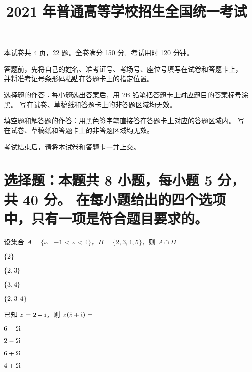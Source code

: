 \documentclass[zihao = -4]{exam-zh}
\begin{document}
\ExplSyntaxOn

\ExplSyntaxOff

\title{2021 年普通高等学校招生全国统一考试}

\subject{数学}

\maketitle

本试卷共 4 页，22 题。全卷满分 150 分。考试用时 120 分钟。

\goodluck

\begin{notice}
  \item 答题前，先将自己的姓名、准考证号、考场号、座位号填写在试卷和答题卡上，
    并将准考证号条形码粘贴在答题卡上的指定位置。
  \item 选择题的作答：每小题选出答案后，用 2B 铅笔把答题卡上对应题目的答案标号涂黑。
    写在试卷、草稿纸和答题卡上的非答题区域均无效。
  \item 填空题和解答题的作答：用黑色签字笔直接答在答题卡上对应的答题区域内。
    写在试卷、草稿纸和答题卡上的非答题区域均无效。
  \item 考试结束后，请将本试卷和答题卡一并上交。
\end{notice}



\section{%
  选择题：本题共 8 小题，每小题 5 分，共 40 分。
  在每小题给出的四个选项中，只有一项是符合题目要求的。
}

\begin{question}
  设集合 $A = \{x \mid -1 < x < 4\}$，$B = \{2, 3, 4, 5\}$，则 $A \cap B = $ \paren

  \begin{choices}
    \item $\{2\}$
    \item $\{2, 3\}$
    \item $\{3, 4\}$
    \item $\{2, 3, 4\}$
  \end{choices}
\end{question}

\begin{question}
  已知 $z = 2 - \mathrm{ i }$，则 $z (\bar{z} + \mathrm{ i }) = $ \paren
  \begin{choices}
    \item $6 - 2\mathrm{ i }$
    \item $2 - 2\mathrm{ i }$
    \item $6 + 2\mathrm{ i }$
    \item $4 + 2\mathrm{ i }$
  \end{choices}
\end{question}
\end{document}
